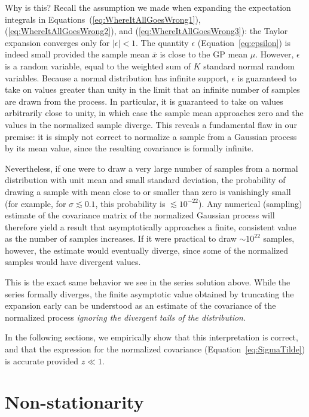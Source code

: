 \documentclass[modern]{aastex62}
\begin{document}
Why is this? Recall the assumption we made when expanding the expectation
integrals in Equations~(\ref{eq:WhereItAllGoesWrong1}), (\ref{eq:WhereItAllGoesWrong2}),
and (\ref{eq:WhereItAllGoesWrong3}): the Taylor expansion converges only for
$\big|\epsilon| < 1$. The quantity $\epsilon$ (Equation~\ref{eq:epsilon})
is indeed small provided the sample mean $\bar{x}$ is close to the GP
mean $\mu$. However, $\epsilon$ is a random variable, equal to
the weighted sum of $K$ standard normal random variables. Because a normal
distribution has infinite support, $\epsilon$ is guaranteed to take on
values greater than unity in the limit that an infinite number of samples
are drawn from the process. In particular, it is guaranteed to take on values
arbitrarily close to unity, in which case the sample mean approaches zero and
the values in the normalized sample diverge.
This reveals a fundamental flaw in our premise:
it is simply not correct to normalize a sample from a Gaussian process by its
mean value, since the resulting covariance is formally infinite.

Nevertheless, if one were to draw a very large number of samples from a normal
distribution with unit mean and small standard deviation,
the probability of drawing a sample with mean close to or smaller than zero
is vanishingly small (for example, for $\sigma \lesssim 0.1$, this probability
is $\lesssim 10^{-22}$).
Any numerical (sampling) estimate of the
covariance matrix of the normalized Gaussian process will therefore yield
a result that asymptotically approaches a finite, consistent value as the
number of samples increases. If it were practical to draw
$\sim 10^{22}$ samples, however, the estimate would eventually diverge, since
some of the normalized samples would have divergent values.

This is the exact same behavior we see in the series solution above.
While the series formally diverges, the finite asymptotic value obtained
by truncating the expansion early can be understood as an estimate of
the covariance of the normalized process \emph{ignoring the divergent
    tails of the distribution}.

In the following sections, we empirically show that this interpretation is
correct, and that the expression for the normalized covariance
(Equation~\ref{eq:SigmaTilde}) is accurate provided $z \ll 1$.

\section{Non-stationarity}
\end{document}
